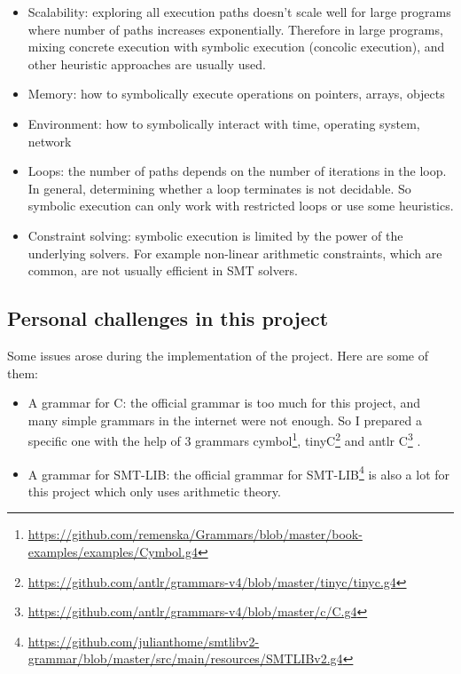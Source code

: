 \documentclass[12pt,a4paper]{article}
\begin{document}
\begin{itemize}
\item Scalability: exploring all execution paths doesn't scale well for large programs where number of paths increases exponentially. Therefore in large programs, mixing concrete execution with symbolic execution (concolic execution), and other heuristic approaches are usually used. 

\item Memory: how to symbolically execute operations on pointers, arrays, objects
\item Environment: how to symbolically interact with time, operating system, network
\item Loops: the number of paths depends on the number of iterations in the loop. In general, determining whether a loop terminates is not decidable. So symbolic execution can only work with restricted loops or use some heuristics. 
\item Constraint solving:  symbolic execution is limited by the power of the underlying solvers. For example non-linear arithmetic constraints, which are common, are not usually efficient in SMT solvers. 

\end{itemize}

\subsection{Personal challenges in this project}

Some issues arose during the implementation of the project. Here are some of them:

\begin{itemize}
\item A grammar for C: the official grammar is too much for this project, and many simple grammars in the internet were not enough. So I prepared a specific one with the help of 3 grammars 
cymbol\footnote{\url{https://github.com/remenska/Grammars/blob/master/book-examples/examples/Cymbol.g4}}, tinyC\footnote{\url{https://github.com/antlr/grammars-v4/blob/master/tinyc/tinyc.g4}}
and antlr C\footnote{\url{https://github.com/antlr/grammars-v4/blob/master/c/C.g4}} .  

\item  A grammar for SMT-LIB: the official grammar for SMT-LIB\footnote{\url{https://github.com/julianthome/smtlibv2-grammar/blob/master/src/main/resources/SMTLIBv2.g4}} is also a lot for this project which only uses arithmetic theory.  
\end{itemize}
\end{document}
